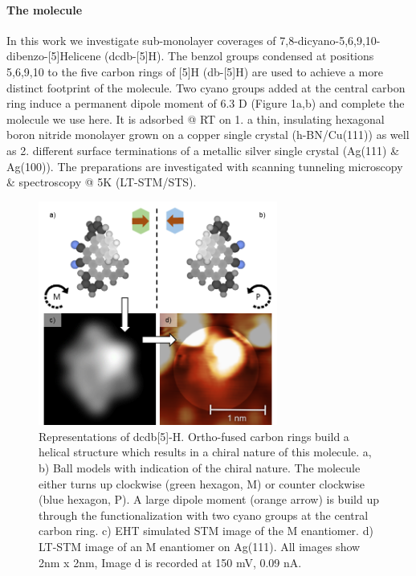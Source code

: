 \paragraph{The molecule}

In this work we investigate sub-monolayer coverages of 7,8-dicyano-5,6,9,10-dibenzo-[5]Helicene (dcdb-[5]H). The benzol groups condensed at positions 5,6,9,10 to the five carbon rings of [5]H (db-[5]H) are used to achieve a more distinct footprint of the molecule. Two cyano groups added at the central carbon ring induce a permanent dipole moment of 6.3 D (Figure 1a,b) and complete the molecule we use here. It is adsorbed @  RT on 1. a thin, insulating hexagonal boron nitride monolayer grown on a copper single crystal (h-BN/Cu(111)) as well as 2. different surface terminations of a metallic silver single crystal (Ag(111) \& Ag(100)). The preparations are investigated with scanning tunneling microscopy \& spectroscopy @ 5K (LT-STM/STS).

\begin{figure} \centering
	\includegraphics[width=0.7\textwidth]{./images/paper/helicene/fig1}
	\caption{Representations of dcdb[5]-H. Ortho-fused carbon rings build a helical structure which results in a chiral nature of this molecule. a, b) Ball models with indication of the chiral nature. The molecule either turns up clockwise (green hexagon, M) or counter clockwise (blue hexagon, P). A large dipole moment (orange arrow) is build up through the functionalization with two cyano groups at the central carbon ring. c) EHT simulated STM image of the M enantiomer. d) LT-STM image of an M enantiomer on Ag(111). All images show 2nm x 2nm, Image d is recorded at 150 mV, 0.09 nA.}
	\label{fig:hel-fig1}
\end{figure}

